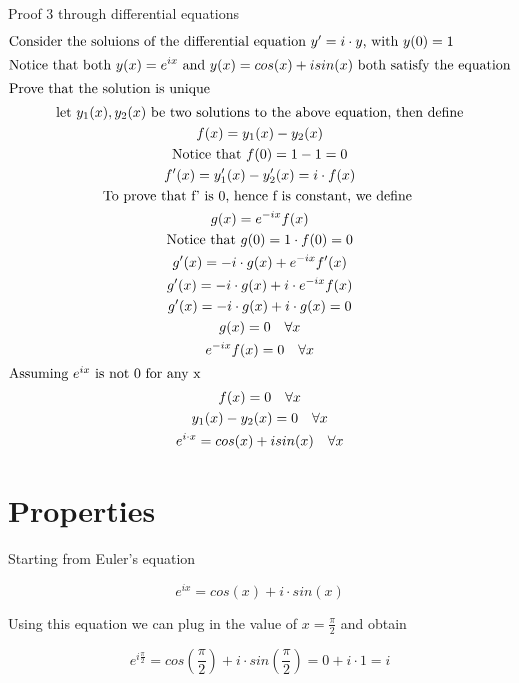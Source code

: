 \documentclass[a4paper]{article}
\begin{document}
\begin{theorem}
Proof 3 through differential equations
\begin{gather*}
\intertext{Consider the soluions of the differential equation $y' = i \cdot y$, with $y(0) = 1$}
\text{Notice that both } y(x) = e^{ix} \text{ and } y(x) = cos(x) + i sin(x) \text{  both satisfy the equation}
\\
\intertext{Prove that the solution is unique}
\text{let $y_1(x), y_2(x)$ be two solutions to the above equation, then define}
\\
f(x) = y_1(x) - y_2(x)
\\
\text{Notice that } f(0) = 1 - 1 = 0
\\
f'(x) = y'_1(x) - y'_2(x) = i \cdot f(x)
\\
\text{To prove that f' is 0, hence f is constant, we define }
\\
g(x) = e^{-ix} f(x)
\\
\text{Notice that } g(0) = 1 \cdot f(0) = 0
\\
g'(x) = -i \cdot g(x) + e^{-ix} f'(x)
\\
g'(x) = -i \cdot g(x) + i \cdot e^{-ix}  f(x)
\\
g'(x) = -i \cdot g(x) + i \cdot g(x) = 0
\\
g(x) = 0 \quad \forall x
\\
e^{-ix} f(x)  = 0 \quad \forall x
\\
\intertext{Assuming $e^{ix}$ is not 0 for any x}
f(x) = 0 \quad \forall x
\\
y_1(x) - y_2(x) = 0 \quad \forall x
\\
e^{i \cdot x} = cos(x) + i sin(x)  \quad \forall x
\end{gather*}

\end{theorem}

\section{Properties}
Starting from Euler's equation
\begin{definition}
$$e^{ix} = cos(x) + i \cdot sin(x)$$
\end{definition}

Using this equation we can plug in the value of $x = \frac{\pi}{2}$ and obtain

\begin{equation}
e^{i\frac{\pi}{2}} = cos(\frac{\pi}{2}) + i \cdot sin(\frac{\pi}{2}) = 0 + i \cdot 1 = i
\end{equation}
\end{document}
